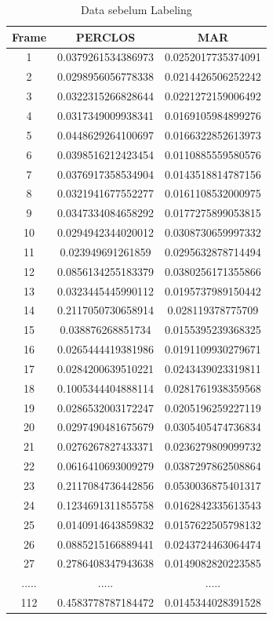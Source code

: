 \begin{longtable}{|c|c|c|}
  \caption{Data sebelum Labeling}
  \label{tb:DatasebelumLabel}                                   \\
  \hline
  \rowcolor[HTML]{C0C0C0}
  \textbf{Frame} & \textbf{PERCLOS} & \textbf{MAR} \\
  \hline


  1 & 0.0379261534386973 & 0.0252017735374091 \\
  2 & 0.0298956056778338 & 0.0214426506252242 \\
  3 & 0.0322315266828644 & 0.0221272159006492 \\
  4 & 0.0317349009938341 & 0.0169105984899276 \\
  5 & 0.0448629264100697 & 0.0166322852613973 \\
  6 & 0.0398516212423454 & 0.0110885559580576 \\
  7 & 0.0376917358534904 & 0.0143518814787156 \\
  8 & 0.0321941677552277 & 0.0161108532000975 \\
  9 & 0.0347334084658292 & 0.0177275899053815 \\
  10 & 0.0294942344020012 & 0.0308730659997332 \\
  11 & 0.023949691261859  & 0.0295632878714494 \\
  12 & 0.0856134255183379 & 0.0380256171355866 \\
  13 & 0.0323445445990112 & 0.0195737989150442 \\
  14 & 0.2117050730658914 & 0.028119378775709  \\
  15 & 0.038876268851734  & 0.0155395239368325 \\
  16 & 0.0265444419381986 & 0.0191109930279671 \\
  17 & 0.0284200639510221 & 0.0243439023319811 \\
  18 & 0.1005344404888114 & 0.0281761938359568 \\
  19 & 0.0286532003172247 & 0.0205196259227119 \\
  20 & 0.0297490481675679 & 0.0305405474736834 \\
  21 & 0.0276267827433371 & 0.0236279809099732 \\
  22 & 0.0616410693009279 & 0.0387297862508864 \\
  23 & 0.2117084736442856 & 0.0530036875401317 \\
  24 & 0.1234691311855758 & 0.0162842335613543 \\
  25 & 0.0140914643859832 & 0.0157622505798132 \\
  26 & 0.0885215166889441 & 0.0243724463064474 \\
  27 & 0.2786408347943638 & 0.0149082820223585 \\
  ..... & ..... & ..... \\
  112 & 0.4583778787184472 & 0.0145344028391528 \\

  \hline
\end{longtable}

